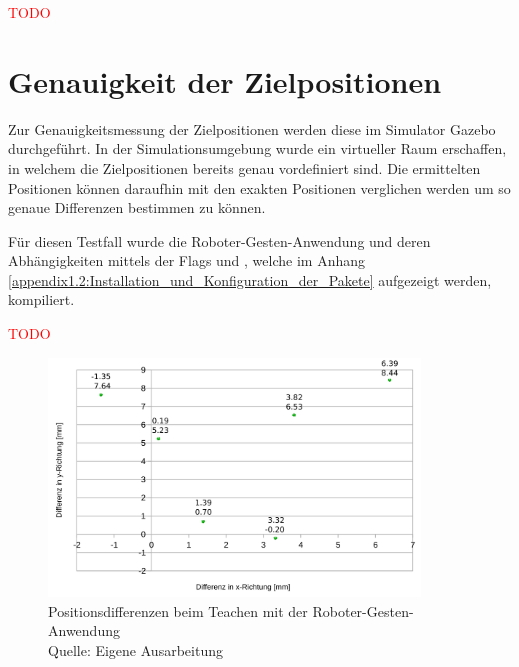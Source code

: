 \textcolor{red}{TODO}

\section{Genauigkeit der Zielpositionen}
Zur Genauigkeitsmessung der Zielpositionen werden diese im Simulator Gazebo durchgeführt. In der Simulationsumgebung wurde ein virtueller Raum erschaffen, in welchem die Zielpositionen bereits genau vordefiniert sind. Die ermittelten Positionen können daraufhin mit den exakten Positionen verglichen werden um so genaue Differenzen bestimmen zu können.

Für diesen Testfall wurde die Roboter-Gesten-Anwendung und deren Abhängigkeiten mittels der Flags  und , welche im Anhang \ref{appendix1.2:Installation_und_Konfiguration_der_Pakete} aufgezeigt werden, kompiliert.

\textcolor{red}{TODO}



\begin{figure}[htb]
	\centering
	\includegraphics[width=0.88\textwidth]{images/ergebnisse/Differenzen_beim_Teachen_mit_Gesten}
	\caption[Positionsdifferenzen beim Teachen mit der Roboter-Gesten-Anwendung]{Positionsdifferenzen beim Teachen mit der Roboter-Gesten-Anwendung\\Quelle: Eigene Ausarbeitung}
	\label{fig:measurement_teaching_positions}
\end{figure}
\FloatBarrier

